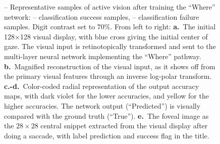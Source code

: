 \begin{figure}[t!]
	\caption{
		{\A-- \E Representative samples of active vision after training the ``Where'' network}: \A-- \B classification success samples, \C-- \E classification failure samples. Digit contrast set to $70\%$. From left to right: {\bf a.}~The initial 128$\times$128 visual display, with blue cross giving the initial center of gaze.
		The visual input is retinotopically transformed and sent to the multi-layer neural network implementing the ``Where'' pathway.
		{\bf b.}~Magnified reconstruction of the visual input, as it shows off from the primary visual features through an inverse log-polar transform.
		{\bf c.-d.}~Color-coded radial representation of the output accuracy maps, with dark violet for the lower accuracies, and yellow for the higher accuracies. The network output (``Predicted'') is visually compared with the ground truth (``True''). %
		{\bf e.}~The foveal image as the $28 \times 28$ central snippet extracted from the visual display after doing a saccade, with label prediction and success flag in the title.
		\label{fig:saccades}}%
\end{figure}%
